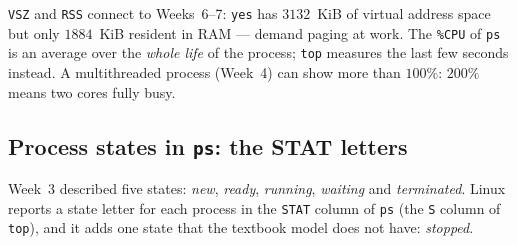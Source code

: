 \documentclass[11pt,a4paper]{article}
\newcommand{\cmd}[1]{\texttt{#1}}
\begin{document}
\texttt{VSZ} and \texttt{RSS} connect to Weeks~6--7: \cmd{yes} has $3132$~KiB of virtual address space but only $1884$~KiB resident in RAM --- demand paging at work. The \texttt{\%CPU} of \cmd{ps} is an average over the \emph{whole life} of the process; \cmd{top} measures the last few seconds instead. A multithreaded process (Week~4) can show more than $100\%$: $200\%$ means two cores fully busy.

\subsection{Process states in \texttt{ps}: the STAT letters}
\label{sec:stat}

Week~3 described five states: \emph{new}, \emph{ready}, \emph{running}, \emph{waiting} and \emph{terminated}. Linux reports a state letter for each process in the \texttt{STAT} column of \cmd{ps} (the \texttt{S} column of \cmd{top}), and it adds one state that the textbook model does not have: \emph{stopped}.
\end{document}
